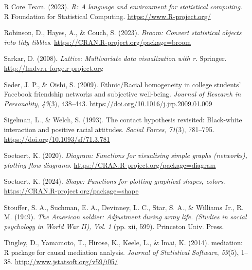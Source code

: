 \documentclass[
  man,floatsintext]{apa7}
\newlength{\cslhangindent}
\newlength{\cslentryspacingunit} %
\newenvironment{CSLReferences}[2] %
 {%
  \setlength{\parindent}{0pt}
  \ifodd #1
  \let\oldpar\par
  \def\par{\hangindent=\cslhangindent\oldpar}
  \fi
  \setlength{\parskip}{#2\cslentryspacingunit}
 }%
 {}
\begin{document}
\begin{CSLReferences}{1}{0}
\leavevmode{}%
R Core Team. (2023). \emph{R: A language and environment for statistical computing}. R Foundation for Statistical Computing. \url{https://www.R-project.org/}

\leavevmode{}%
Robinson, D., Hayes, A., \& Couch, S. (2023). \emph{Broom: Convert statistical objects into tidy tibbles}. \url{https://CRAN.R-project.org/package=broom}

\leavevmode{}%
Sarkar, D. (2008). \emph{Lattice: Multivariate data visualization with r}. Springer. \url{http://lmdvr.r-forge.r-project.org}

\leavevmode{}%
Seder, J. P., \& Oishi, S. (2009). Ethnic/{Racial} homogeneity in college students' {Facebook} friendship networks and subjective well-being. \emph{Journal of Research in Personality}, \emph{43}(3), 438--443. \url{https://doi.org/10.1016/j.jrp.2009.01.009}

\leavevmode{}%
Sigelman, L., \& Welch, S. (1993). The contact hypothesis revisited: {Black-white} interaction and positive racial attitudes. \emph{Social Forces}, \emph{71}(3), 781--795. \url{https://doi.org/10.1093/sf/71.3.781}

\leavevmode{}%
Soetaert, K. (2020). \emph{Diagram: Functions for visualising simple graphs (networks), plotting flow diagrams}. \url{https://CRAN.R-project.org/package=diagram}

\leavevmode{}%
Soetaert, K. (2024). \emph{Shape: Functions for plotting graphical shapes, colors}. \url{https://CRAN.R-project.org/package=shape}

\leavevmode{}%
Stouffer, S. A., Suchman, E. A., Devinney, L. C., Star, S. A., \& Williams Jr., R. M. (1949). \emph{The {American} soldier: {Adjustment} during army life. ({Studies} in social psychology in {World War II}), {Vol}. 1} (pp. xii, 599). Princeton Univ. Press.

\leavevmode{}%
Tingley, D., Yamamoto, T., Hirose, K., Keele, L., \& Imai, K. (2014). {mediation}: {R} package for causal mediation analysis. \emph{Journal of Statistical Software}, \emph{59}(5), 1--38. \url{http://www.jstatsoft.org/v59/i05/}


\end{CSLReferences}
\end{document}

